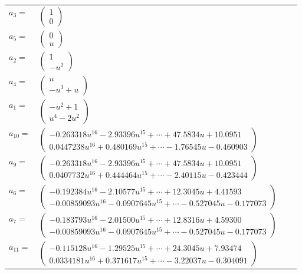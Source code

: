\documentclass[1p]{elsarticle_modified}
\theoremstyle{definition}
\begin{document}
\begin{tabular}{m{7pt} m{180pt} m{7pt} m{180pt} }
\flushright $a_{3}=$&$\begin{pmatrix}1\\0\end{pmatrix}$ \\
\flushright $a_{5}=$&$\begin{pmatrix}0\\u\end{pmatrix}$ \\
\flushright $a_{2}=$&$\begin{pmatrix}1\\- u^2\end{pmatrix}$ \\
\flushright $a_{4}=$&$\begin{pmatrix}u\\- u^3+u\end{pmatrix}$ \\
\flushright $a_{1}=$&$\begin{pmatrix}- u^2+1\\u^4-2 u^2\end{pmatrix}$ \\
\flushright $a_{10}=$&$\begin{pmatrix}-0.263318 u^{16}-2.93396 u^{15}+\cdots+47.5834 u+10.0951\\0.0447238 u^{16}+0.480169 u^{15}+\cdots-1.76545 u-0.460903\end{pmatrix}$ \\
\flushright $a_{9}=$&$\begin{pmatrix}-0.263318 u^{16}-2.93396 u^{15}+\cdots+47.5834 u+10.0951\\0.0407732 u^{16}+0.444464 u^{15}+\cdots-2.40115 u-0.423444\end{pmatrix}$ \\
\flushright $a_{6}=$&$\begin{pmatrix}-0.192384 u^{16}-2.10577 u^{15}+\cdots+12.3045 u+4.41593\\-0.00859093 u^{16}-0.0907645 u^{15}+\cdots-0.527045 u-0.177073\end{pmatrix}$ \\
\flushright $a_{7}=$&$\begin{pmatrix}-0.183793 u^{16}-2.01500 u^{15}+\cdots+12.8316 u+4.59300\\-0.00859093 u^{16}-0.0907645 u^{15}+\cdots-0.527045 u-0.177073\end{pmatrix}$ \\
\flushright $a_{11}=$&$\begin{pmatrix}-0.115128 u^{16}-1.29525 u^{15}+\cdots+24.3045 u+7.93474\\0.0334181 u^{16}+0.371617 u^{15}+\cdots-3.22037 u-0.304091\end{pmatrix}$ \\

\end{tabular}
\end{document}

